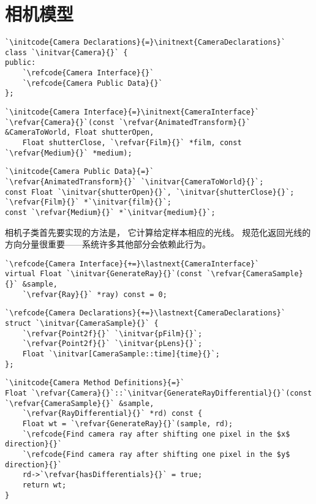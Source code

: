 \section{相机模型}\label{sec:相机模型}

\begin{lstlisting}
`\initcode{Camera Declarations}{=}\initnext{CameraDeclarations}`
class `\initvar{Camera}{}` {
public:
    `\refcode{Camera Interface}{}`
    `\refcode{Camera Public Data}{}`
};
\end{lstlisting}
\begin{lstlisting}
`\initcode{Camera Interface}{=}\initnext{CameraInterface}`
`\refvar{Camera}{}`(const `\refvar{AnimatedTransform}{}` &CameraToWorld, Float shutterOpen,
    Float shutterClose, `\refvar{Film}{}` *film, const `\refvar{Medium}{}` *medium);
\end{lstlisting}
\begin{lstlisting}
`\initcode{Camera Public Data}{=}`
`\refvar{AnimatedTransform}{}` `\initvar{CameraToWorld}{}`;
const Float `\initvar{shutterOpen}{}`, `\initvar{shutterClose}{}`;
`\refvar{Film}{}` *`\initvar{film}{}`;
const `\refvar{Medium}{}` *`\initvar{medium}{}`;
\end{lstlisting}
相机子类首先要实现的方法是，
它计算给定样本相应的光线。
规范化返回光线的方向分量很重要——系统许多其他部分会依赖此行为。
\begin{lstlisting}
`\refcode{Camera Interface}{+=}\lastnext{CameraInterface}`
virtual Float `\initvar{GenerateRay}{}`(const `\refvar{CameraSample}{}` &sample,
    `\refvar{Ray}{}` *ray) const = 0;
\end{lstlisting}
\begin{lstlisting}
`\refcode{Camera Declarations}{+=}\lastnext{CameraDeclarations}`
struct `\initvar{CameraSample}{}` {
    `\refvar{Point2f}{}` `\initvar{pFilm}{}`;
    `\refvar{Point2f}{}` `\initvar{pLens}{}`;
    Float `\initvar[CameraSample::time]{time}{}`;
};
\end{lstlisting}
\begin{lstlisting}
`\initcode{Camera Method Definitions}{=}`
Float `\refvar{Camera}{}`::`\initvar{GenerateRayDifferential}{}`(const `\refvar{CameraSample}{}` &sample,
    `\refvar{RayDifferential}{}` *rd) const {
    Float wt = `\refvar{GenerateRay}{}`(sample, rd);
    `\refcode{Find camera ray after shifting one pixel in the $x$ direction}{}`
    `\refcode{Find camera ray after shifting one pixel in the $y$ direction}{}`
    rd->`\refvar{hasDifferentials}{}` = true;
    return wt;
}
\end{lstlisting}